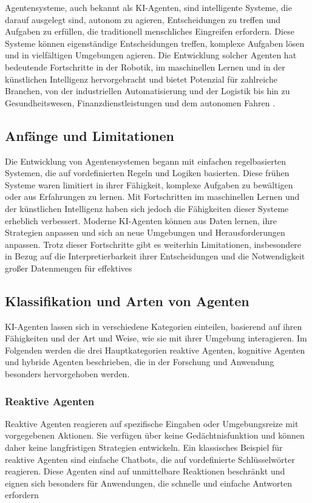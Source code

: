 \documentclass[conference]{IEEEtran}
\begin{document}
Agentensysteme, auch bekannt als KI-Agenten, sind intelligente Systeme, die darauf ausgelegt sind, autonom zu agieren, Entscheidungen zu treffen und Aufgaben zu erfüllen, die traditionell menschliches Eingreifen erfordern. Diese Systeme können eigenständige Entscheidungen treffen, komplexe Aufgaben lösen und in vielfältigen Umgebungen agieren. Die Entwicklung solcher Agenten hat bedeutende Fortschritte in der Robotik, im maschinellen Lernen und in der künstlichen Intelligenz hervorgebracht und bietet Potenzial für zahlreiche Branchen, von der industriellen Automatisierung und der Logistik bis hin zu Gesundheitswesen, Finanzdienstleistungen und dem autonomen Fahren \cite{v-hanki_was_2023}.

\subsection{Anfänge und Limitationen}
Die Entwicklung von Agentensystemen begann mit einfachen regelbasierten Systemen, die auf vordefinierten Regeln und Logiken basierten. Diese frühen Systeme waren limitiert in ihrer Fähigkeit, komplexe Aufgaben zu bewältigen oder aus Erfahrungen zu lernen. Mit Fortschritten im maschinellen Lernen und der künstlichen Intelligenz haben sich jedoch die Fähigkeiten dieser Systeme erheblich verbessert. Moderne KI-Agenten können aus Daten lernen, ihre Strategien anpassen und sich an neue Umgebungen und Herausforderungen anpassen. Trotz dieser Fortschritte gibt es weiterhin Limitationen, insbesondere in Bezug auf die Interpretierbarkeit ihrer Entscheidungen und die Notwendigkeit großer Datenmengen für effektives\cite{kwasny_overcoming_1990} 

\subsection{Klassifikation und Arten von Agenten}
KI-Agenten lassen sich in verschiedene Kategorien einteilen, basierend auf ihren Fähigkeiten und der Art und Weise, wie sie mit ihrer Umgebung interagieren. Im Folgenden werden die drei Hauptkategorien reaktive Agenten, kognitive Agenten und hybride Agenten beschrieben, die in der Forschung und Anwendung besonders hervorgehoben werden. 

\subsubsection{Reaktive Agenten}
Reaktive Agenten reagieren auf spezifische Eingaben oder Umgebungsreize mit vorgegebenen Aktionen. Sie verfügen über keine Gedächtnisfunktion und können daher keine langfristigen Strategien entwickeln. Ein klassisches Beispiel für reaktive Agenten sind einfache Chatbots, die auf vordefinierte Schlüsselwörter reagieren. Diese Agenten sind auf unmittelbare Reaktionen beschränkt und eignen sich besonders für Anwendungen, die schnelle und einfache Antworten erfordern\cite{kwasny_overcoming_1990} 
\end{document}
